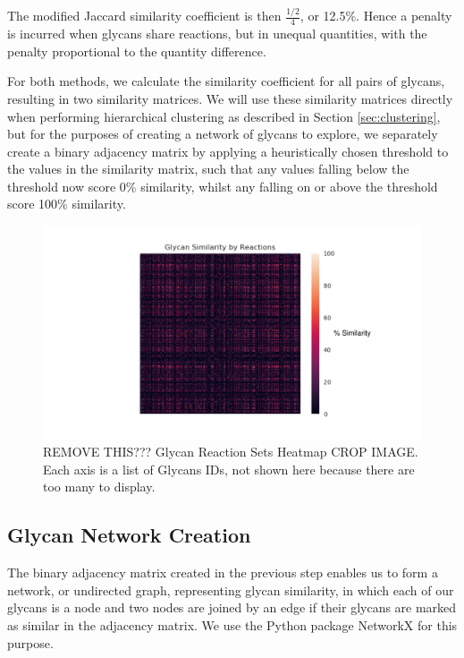 \documentclass[12pt,a4paper]{article}
\begin{document}
The modified Jaccard similarity coefficient is then $\frac{1/2}{4}$, or 12.5\%. Hence a penalty is incurred when glycans share reactions, but in unequal quantities, with the penalty proportional to the quantity difference.

For both methods, we calculate the similarity coefficient for all pairs of glycans, resulting in two similarity matrices. We will use these similarity matrices directly when performing hierarchical clustering as described in Section \ref{sec:clustering}, but for the purposes of creating a network of glycans to explore, we separately create a binary adjacency matrix by applying a heuristically chosen threshold to the values in the similarity matrix, such that any values falling below the threshold now score 0\% similarity, whilst any falling on or above the threshold score 100\% similarity.

\begin{figure}[H]
\centering 
\includegraphics[scale=0.5]{images/heatmap_set_method.pdf} 
\caption{REMOVE THIS??? Glycan Reaction Sets Heatmap CROP IMAGE. Each axis is a list of Glycans IDs, not shown here because there are too many to display.}
\label{fig:heatmap_set_method}
\end{figure}

\subsection{Glycan Network Creation}
\label{sec:network_creation}

The binary adjacency matrix created in the previous step enables us to form a network, or undirected graph, representing glycan similarity, in which each of our glycans is a node and two nodes are joined by an edge if their glycans are marked as similar in the adjacency matrix. We use the Python package NetworkX \citep{hagberg2008exploring} for this purpose.
\end{document}
